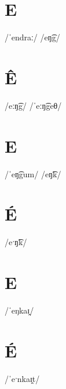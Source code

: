 \documentclass[10pt,a4paper,twoside]{book}
\begin{document}
\section*{E}

\begin{multicols}{3}
 {/ˈendraː/} {}
 {/eŋ͡g/} {}
\end{multicols}

\section*{Ê}

\begin{multicols}{3}
 {/eːŋ͡g/} {}
 {/ˈeːŋ͡geθ/} {}
\end{multicols}

\section*{E}

\begin{multicols}{3}
 {/ˈeŋ͡gum/} {}
 {/eŋ͡k/} {}
\end{multicols}

\section*{É}

\begin{multicols}{3}
 {/eˑŋ͡k/} {}
\end{multicols}

\section*{E}

\begin{multicols}{3}
 {/ˈeŋkaɪ̯/} {}
\end{multicols}

\section*{É}

\begin{multicols}{3}
 {/ˈeˑnkaɪ̯t/} {}
\end{multicols}
\end{document}
